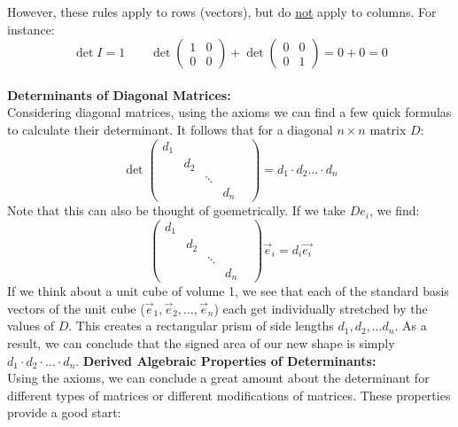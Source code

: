 \documentclass[12pt]{amsart}
\begin{document}
However, these rules apply to rows (vectors), but do \underline{not} apply to columns. For instance:
\[\det I = 1 \quad \quad \det \begin{pmatrix}1&0\\0&0\end{pmatrix}+\det \begin{pmatrix}0&0\\0&1\end{pmatrix} = 0 + 0 = 0\]
\\
\textbf{Determinants of Diagonal Matrices:}\\
Considering diagonal matrices, using the axioms we can find a few quick formulas to calculate their determinant. It follows that for a diagonal $n \times n$ matrix $D$:
\[\det \begin{pmatrix}d_1 & & &  &\\ & d_2  & &\\ & & \ddots \\ & & & d_n\end{pmatrix} = d_1 \cdot d_2 \dots \cdot d_n\]
Note that this can also be thought of goemetrically. If we take $De_i$, we find:
\[\begin{pmatrix}d_1 & & &  &\\ & d_2  & &\\ & & \ddots \\ & & & d_n\end{pmatrix}\vec{e}_i = d_i\vec{e_i}\]
If we think about a unit cube of volume 1, we see that each of the standard basis vectors of the unit cube ($\vec{e}_1, \vec{e}_2, \dots, \vec{e}_n$) each get individually stretched by the values of $D$. This creates a rectangular prism of side lengths $d_1, d_2, \dots d_n$. As a result, we can conclude that the signed area of our new shape is simply $d_1 \cdot d_2 \cdot \dots \cdot d_n$.
\newpage
\textbf{Derived Algebraic Properties of Determinants:}\\
Using the axioms, we can conclude a great amount about the determinant for different types of matrices or different modifications of matrices. These properties provide a good start:
\end{document}
